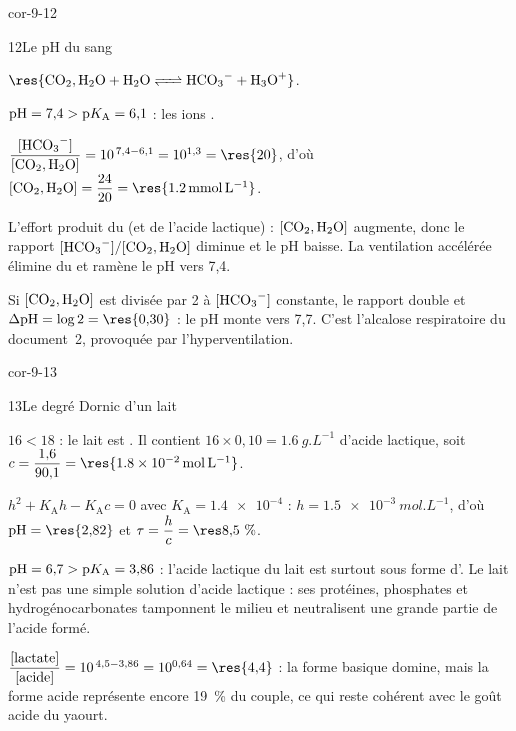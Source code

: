 \begin{blocLivre}{cor-9-12}
\begin{corrige}{12}{Le pH du sang}
\begin{questions}
\item $\res{\ce{CO2,H2O + H2O <=> HCO3^- + H3O+}}$.
\item $\mathrm{pH}=7{,}4>\mathrm{p}K_{\mathrm{A}}=6{,}1$ : les ions .
\item $\dfrac{[\ce{HCO3-}]}{[\ce{CO2,H2O}]}=10^{\,7{,}4-6{,}1}=10^{1{,}3}=\res{20}$, d'où
$[\ce{CO2,H2O}]=\dfrac{24}{20}=\res{\qty{1,2}{mmol.L^{-1}}}$.
\item L'effort produit du  (et de l'acide lactique) : $[\ce{CO2,H2O}]$ augmente, donc le rapport
$[\ce{HCO3-}]/[\ce{CO2,H2O}]$ diminue et le pH baisse. La ventilation accélérée élimine du  et ramène le pH
vers 7,4.
\item Si $[\ce{CO2,H2O}]$ est divisée par 2 à $[\ce{HCO3-}]$ constante, le rapport double et
$\Delta\pH=\log2=\res{0{,}30}$ : le pH monte vers 7,7. C'est l'alcalose respiratoire du document~2, provoquée par
l'hyperventilation.
\end{questions}
\end{corrige}
\end{blocLivre}
\begin{blocLivre}{cor-9-13}
\begin{corrige}{13}{Le degré Dornic d'un lait}
\begin{questions}
\item $16<18$ : le lait est . Il contient $16\times0{,}10=\qty{1,6}{g.L^{-1}}$ d'acide lactique, soit
$c=\dfrac{1{,}6}{90{,}1}=\res{\qty{1,8e-2}{mol.L^{-1}}}$.
\item $h^2+K_\mathrm{A}h-K_\mathrm{A}c=0$ avec $K_\mathrm{A}=\num{1.4e-4}$ : $h=\qty{1,5e-3}{mol.L^{-1}}$, d'où
$\pH=\res{2{,}82}$ et $\tau=\dfrac{h}{c}=\res{8{,}5~\%}$.
\item $\mathrm{pH}=6{,}7>\mathrm{p}K_{\mathrm{A}}=3{,}86$ : l'acide lactique du lait est surtout sous forme d'. Le lait
n'est pas une simple solution d'acide lactique : ses protéines, phosphates et hydrogénocarbonates tamponnent le milieu
et neutralisent une grande partie de l'acide formé.
\item $\dfrac{[\text{lactate}]}{[\text{acide}]}=10^{\,4{,}5-3{,}86}=10^{0{,}64}=\res{4{,}4}$ : la forme basique domine,
mais la forme acide représente encore 19~\% du couple, ce qui reste cohérent avec le goût acide du yaourt.
\end{questions}
\end{corrige}
\end{blocLivre}
